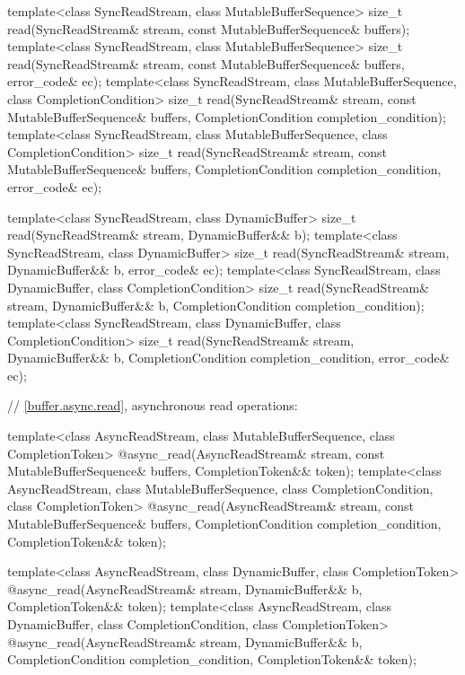 \begin{codeblock}
{{{{  template<class SyncReadStream, class MutableBufferSequence>
    size_t read(SyncReadStream& stream,
                const MutableBufferSequence& buffers);
  template<class SyncReadStream, class MutableBufferSequence>
    size_t read(SyncReadStream& stream,
                const MutableBufferSequence& buffers, error_code& ec);
  template<class SyncReadStream, class MutableBufferSequence,
    class CompletionCondition>
      size_t read(SyncReadStream& stream,
                  const MutableBufferSequence& buffers,
                  CompletionCondition completion_condition);
  template<class SyncReadStream, class MutableBufferSequence,
    class CompletionCondition>
      size_t read(SyncReadStream& stream,
                  const MutableBufferSequence& buffers,
                  CompletionCondition completion_condition,
                  error_code& ec);

  template<class SyncReadStream, class DynamicBuffer>
    size_t read(SyncReadStream& stream, DynamicBuffer&& b);
  template<class SyncReadStream, class DynamicBuffer>
    size_t read(SyncReadStream& stream, DynamicBuffer&& b, error_code& ec);
  template<class SyncReadStream, class DynamicBuffer, class CompletionCondition>
    size_t read(SyncReadStream& stream, DynamicBuffer&& b,
                CompletionCondition completion_condition);
  template<class SyncReadStream, class DynamicBuffer, class CompletionCondition>
    size_t read(SyncReadStream& stream, DynamicBuffer&& b,
                CompletionCondition completion_condition, error_code& ec);

  // \ref{buffer.async.read}, asynchronous read operations:

  template<class AsyncReadStream, class MutableBufferSequence,
    class CompletionToken>
      @\DEDUCED@ async_read(AsyncReadStream& stream,
                         const MutableBufferSequence& buffers,
                         CompletionToken&& token);
  template<class AsyncReadStream, class MutableBufferSequence,
    class CompletionCondition, class CompletionToken>
      @\DEDUCED@ async_read(AsyncReadStream& stream,
                         const MutableBufferSequence& buffers,
                         CompletionCondition completion_condition,
                         CompletionToken&& token);

  template<class AsyncReadStream, class DynamicBuffer, class CompletionToken>
    @\DEDUCED@ async_read(AsyncReadStream& stream,
                       DynamicBuffer&& b, CompletionToken&& token);
  template<class AsyncReadStream, class DynamicBuffer,
    class CompletionCondition, class CompletionToken>
      @\DEDUCED@ async_read(AsyncReadStream& stream,
                         DynamicBuffer&& b,
                         CompletionCondition completion_condition,
                         CompletionToken&& token);

}}}}
\end{codeblock}
